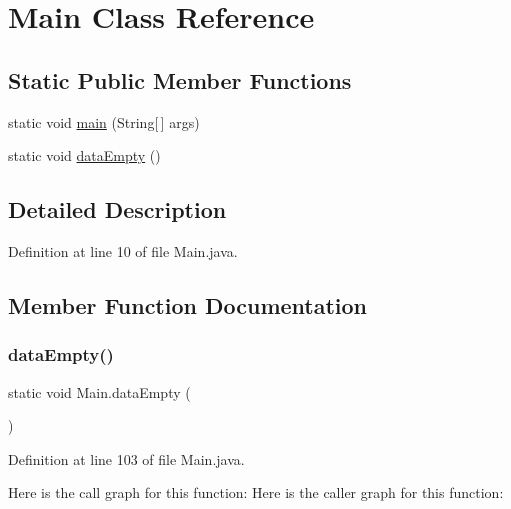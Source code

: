 \hypertarget{class_main}{}\section{Main Class Reference}
\label{class_main}
\subsection*{Static Public Member Functions}
\begin{DoxyCompactItemize}
\item 
static void \hyperlink{class_main_a8a5d0f827edddff706cc0e6740d0579a}{main} (String\mbox{[}$\,$\mbox{]} args)
\item 
static void \hyperlink{class_main_a6c9f248db7c5afa42903c22eaba39d4d}{data\+Empty} ()
\end{DoxyCompactItemize}


\subsection{Detailed Description}


Definition at line 10 of file Main.\+java.



\subsection{Member Function Documentation}
\mbox{\label{class_main_a6c9f248db7c5afa42903c22eaba39d4d}} 
\subsubsection{\texorpdfstring{data\+Empty()}{dataEmpty()}}
{\footnotesize\ttfamily static void Main.\+data\+Empty (\begin{DoxyParamCaption}{ }\end{DoxyParamCaption})\hspace{0.3cm}{\ttfamily [static]}}



Definition at line 103 of file Main.\+java.

Here is the call graph for this function\+:
Here is the caller graph for this function\+:
\mbox{\label{class_main_a8a5d0f827edddff706cc0e6740d0579a}} 
